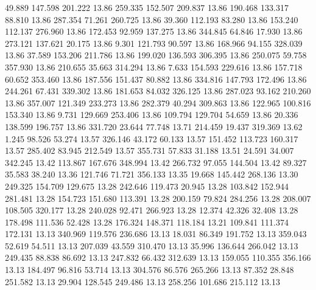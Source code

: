   49.889  147.598  201.222        13.86
 259.335  152.507  209.837        13.86
 190.468  133.317   88.810        13.86
 287.354   71.261  260.725        13.86
  39.360  112.193   83.280        13.86
 153.240  112.137  276.960        13.86
 172.453   92.959  137.275        13.86
 344.845   64.846   17.930        13.86
 273.121  137.621   20.175        13.86
   9.301  121.793   90.597        13.86
 168.966   94.155  328.039        13.86
  37.589  153.206  211.786        13.86
 199.020  136.593  306.395        13.86
 250.075   59.758  357.930        13.86
 210.655   35.663  314.294        13.86
   7.633  154.593  229.616        13.86
 157.718   60.652  353.460        13.86
 187.556  151.437   80.882        13.86
 334.816  147.793  172.496        13.86
 244.261   67.431  339.302        13.86
 181.653   84.032  326.125        13.86
 287.023   93.162  210.260        13.86
 357.007  121.349  233.273        13.86
 282.379   40.294  309.863        13.86
 122.965  100.816  153.340        13.86
   9.731  129.669  253.406        13.86
 109.794  129.704   54.659        13.86
  20.336  138.599  196.757        13.86
 331.720   23.644   77.748        13.71
 214.459   19.437  319.369        13.62
   1.245   98.526   53.274        13.57
 326.146   43.172   60.133        13.57
 151.452  113.723  160.317        13.57
 285.402   83.945  212.549        13.57
 355.731   57.833   31.188        13.51
  24.591   34.007  342.245        13.42
 113.867  167.676  348.994        13.42
 266.732   97.055  144.504        13.42
  89.327   35.583   38.240        13.36
 121.746   71.721  356.133        13.35
  19.668  145.442  268.136        13.30
 249.325  154.709  129.675        13.28
 242.646  119.473   20.945        13.28
 103.842  152.944  281.481        13.28
 154.723  151.680  113.391        13.28
 200.159   79.824  284.256        13.28
 208.007  108.505  320.177        13.28
 240.028   92.471  266.923        13.28
  12.374   42.326   32.408        13.28
 178.498  111.536   52.428        13.28
 176.324  148.371  118.184        13.21
 109.841  111.374  172.131        13.13
 340.969  119.576  236.686        13.13
  18.031   86.349  191.752        13.13
 359.043   52.619   54.511        13.13
 207.039   43.559  310.470        13.13
  35.996  136.644  266.042        13.13
 249.435   88.838   86.692        13.13
 247.832   66.432  312.639        13.13
 159.055  110.355  356.166        13.13
 184.497   96.816   53.714        13.13
 304.576   86.576  265.266        13.13
  87.352   28.848  251.582        13.13
  29.904  128.545  249.486        13.13
 258.256  101.686  215.112        13.13

